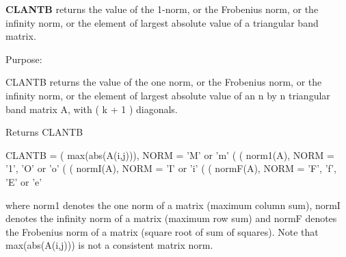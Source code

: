 {\bfseries C\+L\+A\+N\+T\+B} returns the value of the 1-\/norm, or the Frobenius norm, or the infinity norm, or the element of largest absolute value of a triangular band matrix. 

 \begin{DoxyParagraph}{Purpose\+: }
\begin{DoxyVerb} CLANTB  returns the value of the one norm,  or the Frobenius norm, or
 the  infinity norm,  or the element of  largest absolute value  of an
 n by n triangular band matrix A,  with ( k + 1 ) diagonals.\end{DoxyVerb}

\end{DoxyParagraph}
\begin{DoxyReturn}{Returns}
C\+L\+A\+N\+T\+B \begin{DoxyVerb}    CLANTB = ( max(abs(A(i,j))), NORM = 'M' or 'm'
             (
             ( norm1(A),         NORM = '1', 'O' or 'o'
             (
             ( normI(A),         NORM = 'I' or 'i'
             (
             ( normF(A),         NORM = 'F', 'f', 'E' or 'e'

 where  norm1  denotes the  one norm of a matrix (maximum column sum),
 normI  denotes the  infinity norm  of a matrix  (maximum row sum) and
 normF  denotes the  Frobenius norm of a matrix (square root of sum of
 squares).  Note that  max(abs(A(i,j)))  is not a consistent matrix norm.\end{DoxyVerb}
 
\end{DoxyReturn}


